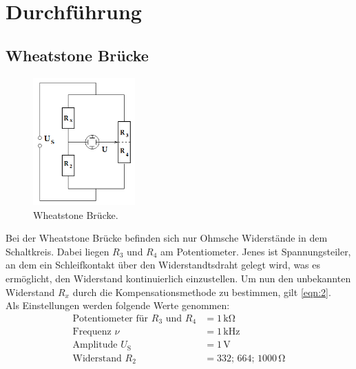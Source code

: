 \section{Durchführung}
\label{sec:Durchführung}

\subsection{Wheatstone Brücke}
\begin{figure}[H]
    \centering
        \centering
        \includegraphics[width=0.35\textwidth]{Bilder/wheatstone.png}
        \caption{Wheatstone Brücke. \cite{anleitung}}
    \hfill
    \label{fig:f2}
\end{figure}
\noindent Bei der Wheatstone Brücke befinden sich nur Ohmsche Widerstände in 
dem Schaltkreis. Dabei liegen $R_3$ und $R_4$ am Potentiometer. Jenes ist
Spannungsteiler, an dem ein Schleifkontakt über den Widerstandtsdraht gelegt
wird, was es ermöglicht, den Widerstand kontinuierlich einzustellen. Um nun
den unbekannten Widerstand $R_x$ durch die Kompensationsmethode zu bestimmen, 
gilt \autoref{eqn:2}.
\\
\noindent Als Einstellungen werden folgende Werte genommen:
\begin{align*}
    \label{eqn:werte1}
    \text{Potentiometer für } R_3 \text{ und } R_4 &= 1\,\unit{\kilo\ohm} \\
    \text{Frequenz } \nu &= 1\,\unit{\kilo\hertz} \\
    \text{Amplitude } U_{\text{S}} &= 1\,\unit{\volt} \\
    \text{Widerstand } R_2 &= 332;\, 664;\, 1000\,\unit{\ohm} \\
\end{align*}


